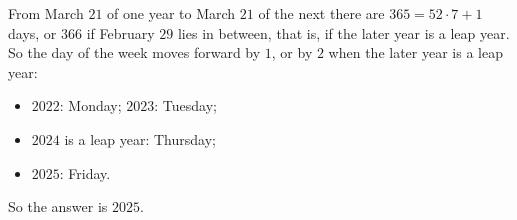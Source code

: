 From March $21$ of one year to March $21$ of the next there are $365=52\cdot7+1$ days, or $366$ if February $29$ lies in between, that is, if the later year is a leap year. So the day of the week moves forward by $1$, or by $2$ when the later year is a leap year:
\begin{itemize}
\item $2022$: Monday; $2023$: Tuesday;
\item $2024$ is a leap year: Thursday;
\item $2025$: Friday.
\end{itemize}
So the answer is $\boxed{2025}$.
